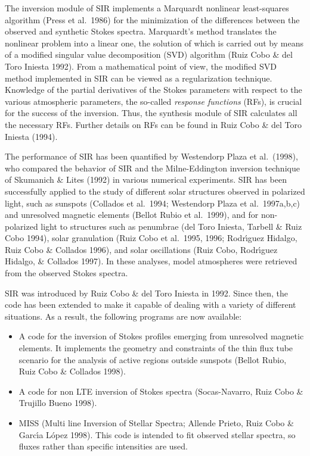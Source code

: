 The inversion module of SIR implements a Marquardt nonlinear
least-squares algorithm (Press et al.\ 1986) for the minimization of
the differences between the observed and synthetic Stokes spectra.
Marquardt's method translates the nonlinear problem into a linear one, 
the solution of which is carried out by means of a modified singular 
value decomposition (SVD) algorithm (Ruiz Cobo \& del Toro
Iniesta 1992). From a mathematical point of view, the modified SVD
method implemented in SIR can be viewed as a regularization technique.
Knowledge of the partial derivatives of the Stokes parameters with
respect to the various atmospheric parameters, the so-called {\em
response functions} (RFs), is crucial for the success of the 
inversion. Thus, the synthesis module of SIR calculates all the
necessary RFs. Further details on RFs can be found in Ruiz 
Cobo \& del Toro Iniesta (1994).

The performance of SIR has been quantified by Westendorp Plaza et
al.\ (1998), who compared the behavior of SIR and the Milne-Eddington
inversion technique of Skumanich \& Lites (1992) in various numerical
experiments. SIR has been successfully applied to the study of
different solar structures observed in polarized light, such as
sunspots (Collados et al.\ 1994; Westendorp Plaza et al.\ 1997a,b,c)
and unresolved magnetic elements (Bellot Rubio et al.\ 1999), and for
non-polarized light to structures such as penumbrae (del Toro Iniesta,
Tarbell \& Ruiz Cobo 1994), solar granulation (Ruiz Cobo et al.\  1995,
1996; Rodr\'{\i}guez Hidalgo, Ruiz Cobo \& Collados 1996), and solar
oscillations (Ruiz Cobo, Rodr\'{\i}guez Hidalgo, \& Collados 1997). In
these analyses, model atmospheres were retrieved from the observed
Stokes spectra.

SIR was introduced by Ruiz Cobo \& del Toro Iniesta in 1992. Since
then, the code has been extended to make it capable of dealing with a
variety of different situations. As a result, the following programs
are now available:
\begin{itemize}
\item A code for the inversion of Stokes profiles emerging from unresolved
magnetic elements. It implements the geometry and constraints of the thin 
flux tube scenario for the analysis of active regions outside sunspots 
(Bellot Rubio, Ruiz Cobo \& Collados 1998). 
\item A code for non LTE inversion of Stokes spectra (Socas-Navarro, 
Ruiz Cobo \& Trujillo Bueno 1998).
\item MISS (Multi line Inversion of Stellar Spectra; Allende Prieto, 
Ruiz Cobo \& Garc\'{\i}a L\'opez 1998). This code is intended to fit 
observed stellar spectra, so fluxes rather than specific intensities 
are used.  
\end{itemize} 

